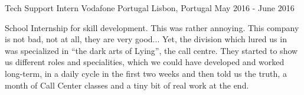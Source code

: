 \begin{cventries}
  \cventry
  {Tech Support Intern} %
  {Vodafone Portugal} %
  {Lisbon, Portugal} %
  {May 2016 - June 2016} %
  { %
    \begin{cvitems}
      \item School Internship for skill development.
      This was rather annoying. This company is not bad, not at all, they are very good... Yet, the division which lured us in was specialized in ``the dark arts of Lying'', the call centre.
      They started to show us different roles and specialities, which we could have developed and worked long-term, in a daily cycle in the first two weeks and then told us the truth, a month of Call Center classes and a tiny bit of real work at the end.
    \end{cvitems}
  }


\end{cventries}